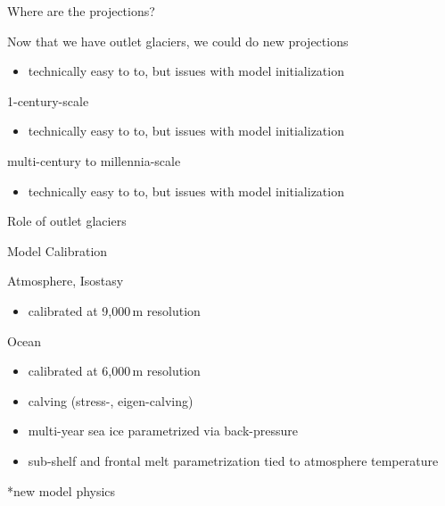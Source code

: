 \documentclass[shownotes notes,intlimits]{beamer}
\begin{document}
\begin{frame}{Where are the projections?}

\begin{block}{Now that we have outlet glaciers, we could do new projections}
  \begin{itemize}
  \item technically easy to to, but issues with model initialization
  \end{itemize}
\end{block}

\begin{block}{1-century-scale}
  \begin{itemize}
  \item technically easy to to, but issues with model initialization
  \end{itemize}
\end{block}


\begin{block}{multi-century to millennia-scale}
  \begin{itemize}
  \item technically easy to to, but issues with model initialization
  \end{itemize}
\end{block}
\end{frame}

\begin{frame}{Role of outlet glaciers}

\end{frame}

\begin{frame}{Model Calibration}
  \begin{block}{Atmosphere, Isostasy}
    \begin{itemize}
    \item calibrated at 9,000\,m resolution
    \end{itemize}
  \end{block}
  \begin{block}{Ocean}
    \begin{itemize}
    \item calibrated at 6,000\,m resolution
    \item calving (\alert{stress}-, eigen-calving)
    \item \alert{multi-year sea ice parametrized via back-pressure}
    \item \alert{sub-shelf and frontal melt} parametrization tied to atmosphere temperature
    \end{itemize}
  \end{block}
    \alert{*new model physics}
\end{frame}
\end{document}
